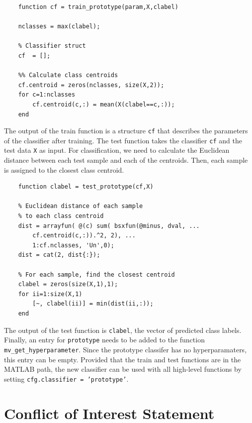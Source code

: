 \documentclass[utf8]{frontiersSCNS} %
\newcommand{\ttt}[1]{\texttt{#1}}
\begin{document}
\begin{verbatim}
    function cf = train_prototype(param,X,clabel)

    nclasses = max(clabel);

    % Classifier struct
    cf  = [];

    %% Calculate class centroids
    cf.centroid = zeros(nclasses, size(X,2));
    for c=1:nclasses
        cf.centroid(c,:) = mean(X(clabel==c,:));
    end
\end{verbatim}

The output of the train function is a structure \ttt{cf} that describes the parameters of the classifier after training. The test function takes the classifier \ttt{cf} and the test data \ttt{X} as input. For classification, we need to calculate the Euclidean distance between each test sample and each of the centroids. Then, each sample is assigned to the closest class centroid.

\begin{verbatim}
    function clabel = test_prototype(cf,X)

    % Euclidean distance of each sample 
    % to each class centroid
    dist = arrayfun( @(c) sum( bsxfun(@minus, dval, ...
        cf.centroid(c,:)).^2, 2), ...
        1:cf.nclasses, 'Un',0);
    dist = cat(2, dist{:});

    % For each sample, find the closest centroid
    clabel = zeros(size(X,1),1);
    for ii=1:size(X,1)
        [~, clabel(ii)] = min(dist(ii,:));
    end

\end{verbatim}

The output of the test function is \ttt{clabel}, the vector of predicted class labels. Finally, an entry for \ttt{prototype} needs to be added to the function \ttt{mv\_get\_hyperparameter}. Since the prototype classifer has no hyperparamaters, this entry can be empty. Provided that the train and test functions are in the MATLAB path, the new classifier can be used with all high-level functions by setting \ttt{cfg.classifier = 'prototype'}.


\section*{Conflict of Interest Statement}
\end{document}
